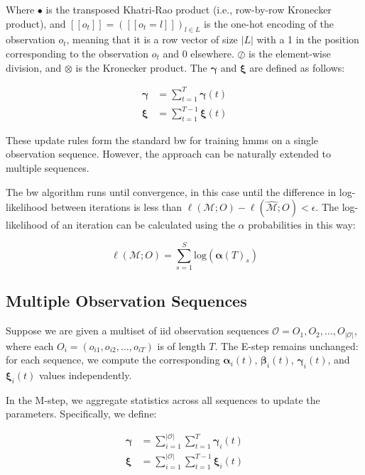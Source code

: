 Where $\smblkcircle$ is the transposed Khatri-Rao product (i.e., row-by-row Kronecker product), and $[[o_t]] = ([[o_t=l]])_{l \in L}$ is the one-hot encoding of the observation $o_t$, meaning that it is a row vector of size $|L|$ with a 1 in the position corresponding to the observation $o_t$ and 0 elsewhere.
$\oslash$ is the element-wise division, and $\otimes$ is the Kronecker product.
The $\pmb{\gamma}$ and $\pmb{\xi}$ are defined as follows:


\begin{align}
    \pmb{\gamma} & = \sum_{t=1}^{T} \pmb{\gamma}(t) \\
    \pmb{\xi}    & = \sum_{t=1}^{T-1} \pmb{\xi}(t)
    \label{eq:gamma-xi-definitions}
\end{align}


These update rules form the standard \gls{bw} for training \glspl{hmm} on a single observation sequence.
However, the approach can be naturally extended to multiple sequences.

The \gls{bw} algorithm runs until convergence, in this case until the difference in log-likelihood between iterations is less than $\ell(\mathcal{M};O) - \ell(\hat{\mathcal{M}};O) < \epsilon$.
The log-likelihood of an iteration can be calculated using the $\alpha$ probabilities in this way:

\begin{equation}
    \ell(\mathcal{M};O) = \sum_{s=1}^{S} \text{log}(\pmb{\alpha}(T)_s)
\end{equation}


\subsection{Multiple Observation Sequences}\label{subsec:multiple-observation-sequences}
Suppose we are given a multiset of \gls{iid} observation sequences $\mathcal{O} = {O_1, O_2, \ldots, O_{|\mathcal{O}|}}$, where each $O_i = (o_{i1}, o_{i2}, \ldots, o_{iT})$ is of length $T$.
The E-step remains unchanged: for each sequence, we compute the corresponding $\pmb{\alpha}_i(t)$, $\pmb{\beta}_i(t)$, $\pmb{\gamma}_i(t)$, and $\pmb{\xi}_i(t)$ values independently.

In the M-step, we aggregate statistics across all sequences to update the parameters.
Specifically, we define:

\begin{align}
    \pmb{\gamma} & = \sum_{i=1}^{|\mathcal{O}|}\sum_{t=1}^{T} \pmb{\gamma}_{i}(t) \\
    \pmb{\xi}    & = \sum_{i=1}^{|\mathcal{O}|}\sum_{t=1}^{T-1} \pmb{\xi}_{i}(t)
\end{align}


